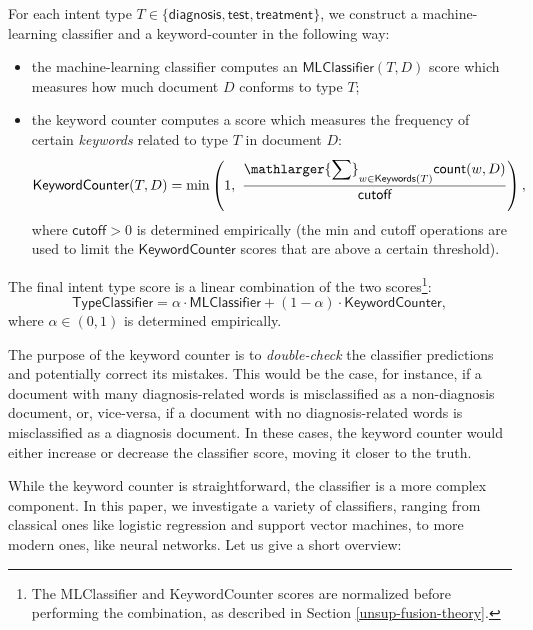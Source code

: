 For each intent type $T\in\{\textsf{diagnosis}, \textsf{test}, \textsf{treatment}\}$,
we construct a machine-learning classifier and a keyword-counter in the following way:
\begin{itemize}
 \item the machine-learning classifier computes an $\textsf{MLClassifier}(T,D)$ score which measures how much document $D$ conforms to type $T$;
 \item the keyword counter computes a score which measures the frequency of certain \emph{keywords} related to type $T$ in document $D$:
 \begin{equation}\label{basic-formula}
  \textsf{KeywordCounter}(T,D) = \min\left(1,\,\, \displaystyle\frac{\displaystyle\mathlarger{\sum}_{w\in \textsf{Keywords}(T)} \textsf{count}(w,D)}{\textsf{cutoff}}\right),
 \end{equation}
  where $\textsf{cutoff} > 0$ is determined empirically (the \textsf{min} and \textsf{cutoff} operations are used to
  limit the $\textsf{KeywordCounter}$ scores that are above a certain threshold).
\end{itemize}

The final intent type score is a linear combination of the two scores\footnote{The \textsf{MLClassifier} and \textsf{KeywordCounter}
scores are normalized before performing the combination, as described in Section \ref{unsup-fusion-theory}.}:
\begin{equation}\label{clf-combine-formula}
 \textsf{TypeClassifier} = \alpha\cdot\textsf{MLClassifier} + (1-\alpha)\cdot\textsf{KeywordCounter},
\end{equation}
where $\alpha\in (0,1)$ is determined empirically.

The purpose of the keyword counter is to \emph{double-check} the classifier predictions and potentially correct its mistakes.
This would be the case, for instance,
if a document with many diagnosis-related words is misclassified as a non-diagnosis document,
or, vice-versa, if a document with no diagnosis-related words is misclassified as a diagnosis document.
In these cases, the keyword counter would either increase or decrease the classifier score, moving it closer to the truth.


While the keyword counter is straightforward, the classifier is a more complex component. In this paper, we investigate
a variety of classifiers, ranging from classical ones like logistic regression and support vector machines, to more modern
ones, like neural networks. Let us give a short overview:

